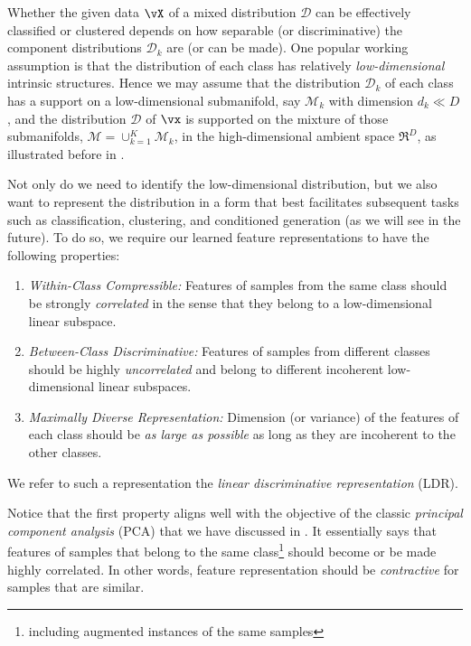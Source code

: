 \documentclass[../../book-main.tex]{subfiles}
\begin{document}
Whether the given data $\vX$ of a mixed distribution $\mathcal{D}$ can
be effectively classified or clustered depends on how separable (or
discriminative) the component distributions $\mathcal{D}_k$ are (or
can be made). One popular working assumption is that the distribution
of each class has relatively {\em low-dimensional} intrinsic
structures. Hence we may assume that the distribution $\mathcal{D}_k$
of each class has a support on a low-dimensional submanifold, say
$\mathcal{M}_k$ with dimension $d_k \ll D$, and the distribution
$\mathcal D$ of $\vx$ is supported on the mixture of those
submanifolds, $\mathcal M = \cup_{k=1}^K \mathcal{M}_k$,  in the
high-dimensional ambient space $\Re^D$, as illustrated before in
.

Not only do we need to identify the low-dimensional distribution, but
we also want to represent the distribution in a form that best
facilitates subsequent tasks such as classification, clustering, and
conditioned generation (as we will see in the future). To do so, we
require our learned feature representations to have the following
properties:
\begin{enumerate}
    \item {\em Within-Class Compressible:} Features of samples from the
        same class should be strongly {\em correlated} in the sense that
        they belong to a low-dimensional linear subspace.
    \item {\em Between-Class Discriminative:} Features of samples from
        different classes should be highly {\em uncorrelated} and belong
        to different incoherent low-dimensional linear subspaces.
    \item {\em Maximally Diverse Representation:} Dimension (or variance)
        of the features of each class should be {\em as large as
        possible} as long as they are incoherent to the other classes.
\end{enumerate}
We refer to such a representation the {\em linear discriminative
representation} (LDR).

Notice that the first property aligns well with the objective of the
classic {\em principal component analysis} (PCA) that we have
discussed in . It essentially says that features of
samples that belong to the same class\footnote{including augmented
instances of the same samples} should become or be made highly
correlated. In other words, feature representation should be {\em
contractive} for samples that are similar.
\end{document}
